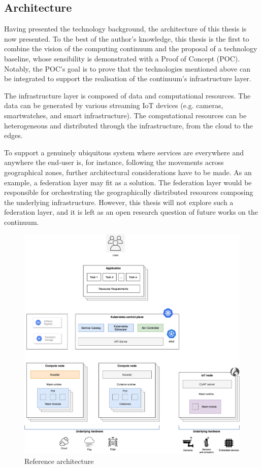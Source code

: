 \subsection{Architecture}

Having presented the technology background, the architecture of this thesis is now presented. To the best of the author's knowledge, this thesis is the first to combine the vision of the computing continuum and the proposal of a technology baseline, whose sensibility is demonstrated with a Proof of Concept (POC). Notably, the POC's goal is to prove that the technologies mentioned above can be integrated to support the realisation of the continuum's infrastructure layer. 

The infrastructure layer is composed of data and computational resources. The data can be generated by various streaming IoT devices (e.g. cameras, smartwatches, and smart infrastructure). The computational resources can be heterogeneous and distributed through the infrastructure, from the cloud to the edges.

To support a genuinely ubiquitous system where services are everywhere and anywhere the end-user is, for instance, following the movements across geographical zones, further architectural considerations have to be made. As an example, a federation layer may fit as a solution. The federation layer would be responsible for orchestrating the geographically distributed resources composing the underlying infrastructure. However, this thesis will not explore such a federation layer, and it is left as an open research question of future works on the continuum.

\begin{figure}[h]
\centering
\includegraphics[width=\columnwidth]{figures/architecture}
\caption{Reference architecture \label{fig:architecture}}
\end{figure}

